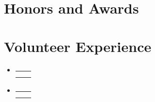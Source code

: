 \documentclass[a4paper,20pt]{article}
\makeatletter
\newcommand{\resumeSubheading}[4]{
  \vspace{-1pt}\item
    \begin{tabular*}{0.97\textwidth}{l@{\extracolsep{\fill}}r}
      \textbf{#1} & #2 \\
      \textit{#3} & \textit{#4} \\
    \end{tabular*}\vspace{-5pt}
}
\newcommand{\resumeSubHeadingListStart}{\begin{itemize}[leftmargin=*]}
\newcommand{\resumeSubHeadingListEnd}{\end{itemize}}
\makeatother
\begin{document}
\section{Honors and Awards}
\begin{description}[font=$\bullet$]
\item {}
\vspace{-5pt}
\item {}
\vspace{-5pt}
\item {}

\end{description}

\vspace{-5pt}
\section{Volunteer Experience}
  \resumeSubHeadingListStart
	\resumeSubheading
    {}{}
    {}{}
\vspace{5pt}
    \resumeSubheading
    {}{}
    {}{}

\resumeSubHeadingListEnd
\end{document}
